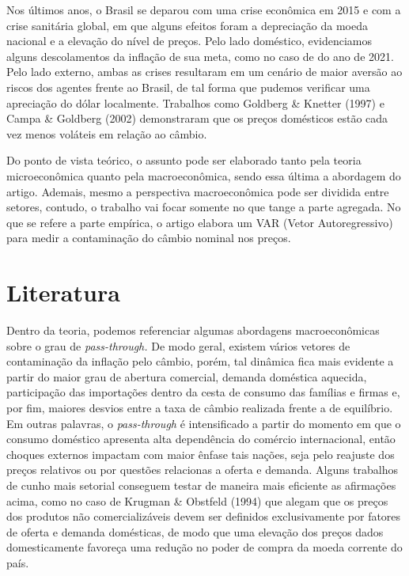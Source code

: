 \documentclass[12pt]{article}
\begin{document}
Nos últimos anos, o Brasil se deparou com uma crise econômica em 2015 e
com a crise sanitária global, em que alguns efeitos foram a depreciação
da moeda nacional e a elevação do nível de preços. Pelo lado doméstico,
evidenciamos alguns descolamentos da inflação de sua meta, como no caso
de do ano de 2021. Pelo lado externo, ambas as crises resultaram em um
cenário de maior aversão ao riscos dos agentes frente ao Brasil, de tal
forma que pudemos verificar uma apreciação do dólar localmente.
Trabalhos como Goldberg \& Knetter (1997) e Campa \& Goldberg (2002)
demonstraram que os preços domésticos estão cada vez menos voláteis em
relação ao câmbio.

Do ponto de vista teórico, o assunto pode ser elaborado tanto pela
teoria microeconômica quanto pela macroeconômica, sendo essa última a
abordagem do artigo. Ademais, mesmo a perspectiva macroeconômica pode
ser dividida entre setores, contudo, o trabalho vai focar somente no que
tange a parte agregada. No que se refere a parte empírica, o artigo
elabora um VAR (Vetor Autoregressivo) para medir a contaminação do
câmbio nominal nos preços.

\hypertarget{literatura}{%
\section{Literatura}\label{literatura}}

Dentro da teoria, podemos referenciar algumas abordagens macroeconômicas
sobre o grau de \emph{pass-through.} De modo geral, existem vários
vetores de contaminação da inflação pelo câmbio, porém, tal dinâmica
fica mais evidente a partir do maior grau de abertura comercial, demanda
doméstica aquecida, participação das importações dentro da cesta de
consumo das famílias e firmas e, por fim, maiores desvios entre a taxa
de câmbio realizada frente a de equilíbrio. Em outras palavras, o
\emph{pass-through} é intensificado a partir do momento em que o consumo
doméstico apresenta alta dependência do comércio internacional, então
choques externos impactam com maior ênfase tais nações, seja pelo
reajuste dos preços relativos ou por questões relacionas a oferta e
demanda. Alguns trabalhos de cunho mais setorial conseguem testar de
maneira mais eficiente as afirmações acima, como no caso de Krugman \&
Obstfeld (1994) que alegam que os preços dos produtos não
comercializáveis devem ser definidos exclusivamente por fatores de
oferta e demanda domésticas, de modo que uma elevação dos preços dados
domesticamente favoreça uma redução no poder de compra da moeda corrente
do país.
\end{document}
